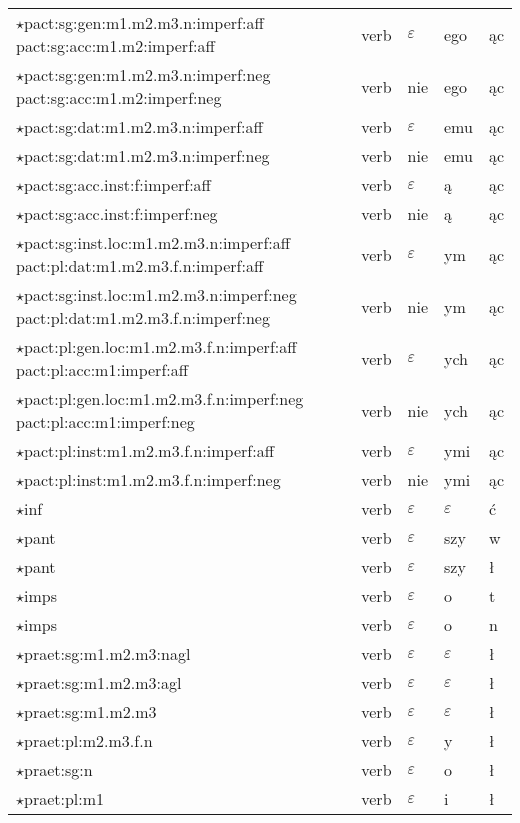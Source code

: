 \documentclass{article}
\begin{document}
\begin{longtable}{p{7cm}|l|l|l|l}
$\star$pact:sg:gen:m1.m2.m3.n:imperf:aff pact:sg:acc:m1.m2:imperf:aff & verb & $\varepsilon$ & ego & ąc\\
$\star$pact:sg:gen:m1.m2.m3.n:imperf:neg pact:sg:acc:m1.m2:imperf:neg & verb & nie & ego & ąc\\
$\star$pact:sg:dat:m1.m2.m3.n:imperf:aff & verb & $\varepsilon$ & emu & ąc\\
$\star$pact:sg:dat:m1.m2.m3.n:imperf:neg & verb & nie & emu & ąc\\
$\star$pact:sg:acc.inst:f:imperf:aff & verb & $\varepsilon$ & ą & ąc\\
$\star$pact:sg:acc.inst:f:imperf:neg & verb & nie & ą & ąc\\
$\star$pact:sg:inst.loc:m1.m2.m3.n:imperf:aff pact:pl:dat:m1.m2.m3.f.n:imperf:aff & verb & $\varepsilon$ & ym & ąc\\
$\star$pact:sg:inst.loc:m1.m2.m3.n:imperf:neg pact:pl:dat:m1.m2.m3.f.n:imperf:neg & verb & nie & ym & ąc\\
$\star$pact:pl:gen.loc:m1.m2.m3.f.n:imperf:aff pact:pl:acc:m1:imperf:aff & verb & $\varepsilon$ & ych & ąc\\
$\star$pact:pl:gen.loc:m1.m2.m3.f.n:imperf:neg pact:pl:acc:m1:imperf:neg & verb & nie & ych & ąc\\
$\star$pact:pl:inst:m1.m2.m3.f.n:imperf:aff & verb & $\varepsilon$ & ymi & ąc\\
$\star$pact:pl:inst:m1.m2.m3.f.n:imperf:neg & verb & nie & ymi & ąc\\
$\star$inf & verb & $\varepsilon$ & $\varepsilon$ & ć\\
$\star$pant & verb & $\varepsilon$ & szy & w\\
$\star$pant & verb & $\varepsilon$ & szy & ł\\
$\star$imps & verb & $\varepsilon$ & o & t\\
$\star$imps & verb & $\varepsilon$ & o & n\\
$\star$praet:sg:m1.m2.m3:nagl & verb & $\varepsilon$ & $\varepsilon$ & ł\\
$\star$praet:sg:m1.m2.m3:agl & verb & $\varepsilon$ & $\varepsilon$ & ł\\
$\star$praet:sg:m1.m2.m3 & verb & $\varepsilon$ & $\varepsilon$ & ł\\
$\star$praet:pl:m2.m3.f.n & verb & $\varepsilon$ & y & ł\\
$\star$praet:sg:n & verb & $\varepsilon$ & o & ł\\
$\star$praet:pl:m1 & verb & $\varepsilon$ & i & ł\\

\end{longtable}
\end{document}
